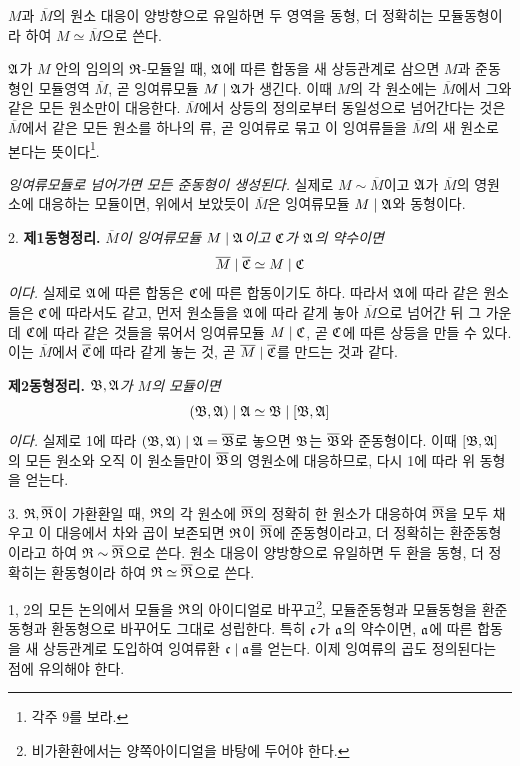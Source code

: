 \(M\)과 \(\overline M\)의 원소 대응이 양방향으로 유일하면 두 영역을 동형, 더 정확히는 모듈동형이라 하여 \(M\simeq\overline M\)으로 쓴다.

\(\mathfrak A\)가 \(M\) 안의 임의의 \(\mathfrak{R}\)-모듈일 때, \(\mathfrak A\)에 따른 합동을 새 상등관계로 삼으면 \(M\)과 준동형인 모듈영역 \(\overline M\), 곧 잉여류모듈 \(M\mid\mathfrak A\)가 생긴다. 이때 \(M\)의 각 원소에는 \(\overline M\)에서 그와 같은 모든 원소만이 대응한다. \(\overline M\)에서 상등의 정의로부터 동일성으로 넘어간다는 것은 \(\overline M\)에서 같은 모든 원소를 하나의 류, 곧 잉여류로 묶고 이 잉여류들을 \(\overline M\)의 새 원소로 본다는 뜻이다\footnote{각주 9를 보라.}.

\emph{잉여류모듈로 넘어가면 모든 준동형이 생성된다.} 실제로 \(M\sim\overline M\)이고 \(\mathfrak A\)가 \(\overline M\)의 영원소에 대응하는 모듈이면, 위에서 보았듯이 \(\overline M\)은 잉여류모듈 \(M\mid\mathfrak A\)와 동형이다.

2. \textbf{제1동형정리.} \emph{\(\overline M\)이 잉여류모듈 \(M\mid\mathfrak A\)이고 \(\mathfrak{C}\)가 \(\mathfrak A\)의 약수이면
\[
        \overline M\mid\overline{\mathfrak{C}}\simeq M\mid\mathfrak{C}
\]
이다.}
실제로 \(\mathfrak A\)에 따른 합동은 \(\mathfrak{C}\)에 따른 합동이기도 하다. 따라서 \(\mathfrak A\)에 따라 같은 원소들은 \(\mathfrak{C}\)에 따라서도 같고, 먼저 원소들을 \(\mathfrak A\)에 따라 같게 놓아 \(\overline M\)으로 넘어간 뒤 그 가운데 \(\mathfrak{C}\)에 따라 같은 것들을 묶어서 잉여류모듈 \(M\mid\mathfrak{C}\), 곧 \(\mathfrak{C}\)에 따른 상등을 만들 수 있다. 이는 \(\overline M\)에서 \(\overline{\mathfrak{C}}\)에 따라 같게 놓는 것, 곧 \(\overline M\mid\overline{\mathfrak{C}}\)를 만드는 것과 같다.

\textbf{제2동형정리.} \emph{\(\mathfrak B,\mathfrak A\)가 \(M\)의 모듈이면
\[
        (\mathfrak B,\mathfrak A)\mid\mathfrak A\simeq \mathfrak B\mid[\mathfrak B,\mathfrak A]
\]
이다.}
실제로 1에 따라 \((\mathfrak B,\mathfrak A)\mid\mathfrak A=\overline{\mathfrak B}\)로 놓으면 \(\mathfrak B\)는 \(\overline{\mathfrak B}\)와 준동형이다. 이때 \([\mathfrak B,\mathfrak A]\)의 모든 원소와 오직 이 원소들만이 \(\overline{\mathfrak B}\)의 영원소에 대응하므로, 다시 1에 따라 위 동형을 얻는다.

3. \(\mathfrak{R},\overline{\mathfrak{R}}\)이 가환환일 때, \(\mathfrak{R}\)의 각 원소에 \(\overline{\mathfrak{R}}\)의 정확히 한 원소가 대응하여 \(\overline{\mathfrak{R}}\)을 모두 채우고 이 대응에서 차와 곱이 보존되면 \(\mathfrak{R}\)이 \(\overline{\mathfrak{R}}\)에 준동형이라고, 더 정확히는 환준동형이라고 하여 \(\mathfrak{R}\sim\overline{\mathfrak{R}}\)으로 쓴다. 원소 대응이 양방향으로 유일하면 두 환을 동형, 더 정확히는 환동형이라 하여 \(\mathfrak{R}\simeq\overline{\mathfrak{R}}\)으로 쓴다.

1, 2의 모든 논의에서 모듈을 \(\mathfrak{R}\)의 아이디얼로 바꾸고\footnote{비가환환에서는 양쪽아이디얼을 바탕에 두어야 한다.}, 모듈준동형과 모듈동형을 환준동형과 환동형으로 바꾸어도 그대로 성립한다. 특히 \(\mathfrak{c}\)가 \(\mathfrak{a}\)의 약수이면, \(\mathfrak{a}\)에 따른 합동을 새 상등관계로 도입하여 잉여류환 \(\mathfrak{c}\mid\mathfrak{a}\)를 얻는다. 이제 잉여류의 곱도 정의된다는 점에 유의해야 한다.

